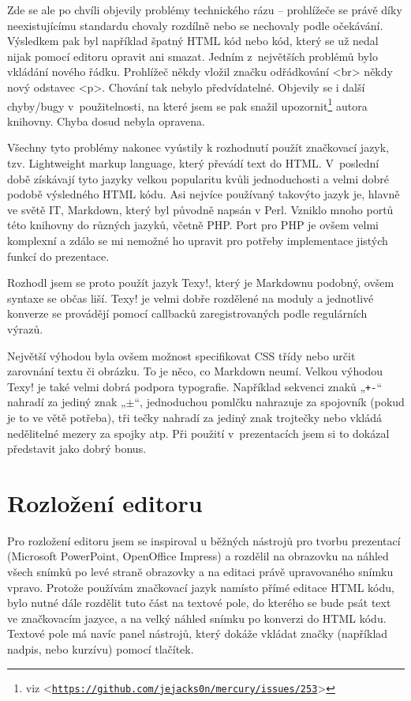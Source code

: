 \documentclass[11pt,twoside,a4paper]{book}
\let\oldUrl\url									%
\renewcommand\url[1]{<\texttt{\oldUrl{#1}}>}
\begin{document}
Zde se ale po chvíli objevily problémy technického rázu – prohlížeče se právě díky neexistujícímu
standardu chovaly rozdílně nebo se nechovaly podle očekávání. Výsledkem pak byl například špatný HTML kód nebo kód,
který se už nedal nijak pomocí editoru opravit ani smazat. Jedním z~největších problémů bylo vkládání nového řádku.
Prohlížeč někdy vložil značku odřádkování {\textless}br{\textgreater} někdy nový odstavec {\textless}p{\textgreater}.
Chování tak nebylo předvídatelné. Objevily se i další chyby/bugy v~použitelnosti, na které jsem se pak snažil
upozornit\footnote{viz \url{https://github.com/jejacks0n/mercury/issues/253}} autora knihovny. Chyba dosud nebyla opravena.

Všechny tyto problémy nakonec vyústily k rozhodnutí použít značkovací jazyk, tzv. Lightweight markup language, který
převádí text do HTML. V~poslední době získávají tyto jazyky velkou popularitu kvůli jednoduchosti a velmi dobré podobě
výsledného HTML kódu. Asi nejvíce používaný takovýto jazyk je, hlavně ve světě IT, Markdown, který byl původně napsán v
Perl. Vzniklo mnoho portů této knihovny do různých jazyků, včetně PHP. Port pro PHP je ovšem velmi komplexní a zdálo se
mi nemožné ho upravit pro potřeby implementace jistých funkcí do prezentace.

Rozhodl jsem se proto použít jazyk Texy!, který je Markdownu podobný, ovšem syntaxe se občas liší. Texy! je velmi dobře
rozdělené na moduly a jednotlivé konverze se provádějí pomocí callbacků zaregistrovaných podle regulárních výrazů.

Největší výhodou byla ovšem možnost specifikovat CSS třídy nebo určit zarovnání textu či obrázku. To je něco, co Markdown neumí. Velkou výhodou Texy! je také velmi dobrá podpora typografie. Například sekvenci znaků „\lstinline|+-|“ nahradí za jediný znak „$\pm$“, jednoduchou pomlčku nahrazuje za spojovník (pokud je to ve větě potřeba), tři tečky nahradí za jediný znak trojtečky nebo vkládá nedělitelné mezery za spojky atp. Při použití v~prezentacích jsem si to dokázal představit jako dobrý bonus.


\section{Rozložení editoru}
Pro rozložení editoru jsem se inspiroval u běžných nástrojů pro tvorbu prezentací (Microsoft PowerPoint, OpenOffice
Impress) a rozdělil na obrazovku na náhled všech snímků po levé straně obrazovky a na editaci právě upravovaného snímku
vpravo. Protože používám značkovací jazyk namísto přímé editace HTML kódu, bylo nutné dále rozdělit tuto část na
textové pole, do kterého se bude psát text ve značkovacím jazyce, a na velký náhled snímku po konverzi do HTML kódu.
Textové pole má navíc panel nástrojů, který dokáže vkládat značky (například nadpis, nebo kurzívu) pomocí tlačítek.
\end{document}
